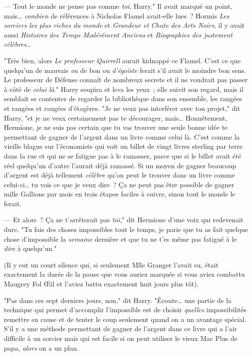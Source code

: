 --- Tout le monde ne pense pas comme \emph{toi}, Harry." Il avait marqué un point, mais… \emph{combien} de références à Nicholas Flamel avait-elle lues~? Hormis \emph{Les sorciers les plus riches du monde} et \emph{Grandeur et Chute des Arts Noirs}, il y avait aussi \emph{Histoires des Temps Modérément Anciens} et \emph{Biographies des justement célèbres}…

"Très bien, alors \emph{Le professeur Quirrell} aurait kidnappé ce Flamel. C'est ce que quelqu'un de mauvais \emph{ou} de bon ou \emph{d'égoïste} ferait s'il avait le moindre bon sens. Le professeur de Défense connaît de nombreux secrets et il ne voudrait pas passer à côté de \emph{celui là}." Harry soupira et leva les yeux~; elle suivit son regard, mais il semblait se contenter de regarder la bibliothèque dans son ensemble, les rangées et rangées et rangées d'étagères. "Je ne veux pas interférer avec ton projet," dit Harry, "et je ne veux certainement pas te décourager, mais… Honnêtement, Hermione, je ne suis pas certain que tu vas trouver une seule bonne idée te permettant de gagner de l'argent dans un livre comme celui là. C'est comme la vieille blague sur l'économiste qui voit un billet de vingt livres sterling par terre dans la rue et qui ne se fatigue pas à le ramasser, parce que si le billet avait été réel quelqu'un d'autre l'aurait déjà ramassé. Si un moyen de gagner beaucoup d'argent est déjà tellement \emph{célèbre} qu'on peut le trouver dans un livre comme celui-ci… tu vois ce que je veux dire~? Ça ne peut pas être possible de gagner mille Gallions par mois en trois étapes faciles à suivre, sinon tout le monde le ferait.

--- Et alors~? Ça ne t'arrêterait pas \emph{toi}," dit Hermione d'une voix qui redevenait dure. "Tu fais des choses impossibles tout le temps, je parie que tu as fait quelque chose d'impossible la \emph{semaine} dernière et que tu ne t'es même pas fatigué à le \emph{dire} à quelqu'un."

(Il y eut un court silence qui, si seulement Mlle Granger l'avait su, était exactement la durée de la pause que vous auriez marquée si vous aviez combattu Maugrey Fol Œil et l'aviez battu exactement huit jours plus tôt).

"Pas dans ces sept derniers jours, non," dit Harry. "Écoute… une partie de la technique qui permet d'accomplir l'impossible est de choisir \emph{quelles} impossibilités remettre en cause et de tenter le coup seulement quand on a un avantage spécial. S'il y a une méthode permettant de gagner de l'argent dans ce livre qui a l'air difficile à un sorcier mais qui est facile si on peut utiliser le vieux Mac Plus de papa, \emph{alors} on a un plan.

